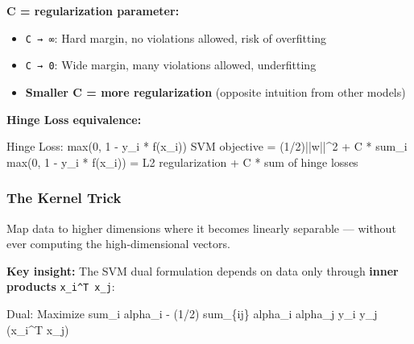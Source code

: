 \documentclass[11pt]{article}
\providecommand{\tightlist}{\setlength{\itemsep}{1pt}\setlength{\parskip}{0pt}}
\newenvironment{Shaded}{\begin{snugshade}}{\end{snugshade}}
\newcommand{\BuiltInTok}[1]{\textcolor[rgb]{0.50,0.55,0.55}{#1}}
\newcommand{\DecValTok}[1]{\textcolor[rgb]{0.96,0.45,0.00}{#1}}
\newcommand{\NormalTok}[1]{\textcolor[rgb]{0.81,0.81,0.76}{#1}}
\newcommand{\OperatorTok}[1]{\textcolor[rgb]{0.81,0.81,0.76}{#1}}
\begin{document}
\textbf{C = regularization parameter:}

\begin{itemize}
\tightlist
\item
  \texttt{C\ →\ ∞}: Hard margin, no violations allowed, risk of overfitting
\item
  \texttt{C\ →\ 0}: Wide margin, many violations allowed, underfitting
\item
  \textbf{Smaller C = more regularization} (opposite intuition from other models)
\end{itemize}

\textbf{Hinge Loss equivalence:}


\begin{Shaded}
\begin{Highlighting}[]
\NormalTok{Hinge Loss: }\BuiltInTok{max}\NormalTok{(}\DecValTok{0}\NormalTok{, }\DecValTok{1} \OperatorTok{{-}}\NormalTok{ y\_i }\OperatorTok{*}\NormalTok{ f(x\_i))}
\NormalTok{SVM objective }\OperatorTok{=}\NormalTok{ (}\DecValTok{1}\OperatorTok{/}\DecValTok{2}\NormalTok{)}\OperatorTok{||}\NormalTok{w}\OperatorTok{||\^{}}\DecValTok{2} \OperatorTok{+}\NormalTok{ C }\OperatorTok{*}\NormalTok{ sum\_i }\BuiltInTok{max}\NormalTok{(}\DecValTok{0}\NormalTok{, }\DecValTok{1} \OperatorTok{{-}}\NormalTok{ y\_i }\OperatorTok{*}\NormalTok{ f(x\_i))}
             \OperatorTok{=}\NormalTok{ L2 regularization }\OperatorTok{+}\NormalTok{ C }\OperatorTok{*} \BuiltInTok{sum}\NormalTok{ of hinge losses}
\end{Highlighting}
\end{Shaded}

\subsubsection{The Kernel Trick}\label{the-kernel-trick}

Map data to higher dimensions where it becomes linearly separable --- without ever computing the high-dimensional vectors.

\textbf{Key insight:} The SVM dual formulation depends on data only through \textbf{inner products} \texttt{x\_i\^{}T\ x\_j}:


\begin{Shaded}
\begin{Highlighting}[]
\NormalTok{Dual: Maximize sum\_i alpha\_i }\OperatorTok{{-}}\NormalTok{ (}\DecValTok{1}\OperatorTok{/}\DecValTok{2}\NormalTok{) sum\_\{ij\} alpha\_i alpha\_j y\_i y\_j (x\_i}\OperatorTok{\^{}}\NormalTok{T x\_j)}
\end{Highlighting}
\end{Shaded}
\end{document}
